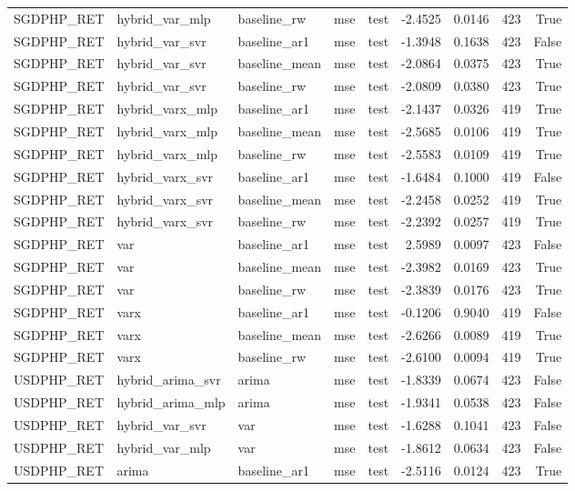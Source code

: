 \begin{tabular}{lllllrrrr}
SGDPHP_RET & hybrid_var_mlp & baseline_rw & mse & test & -2.4525 & 0.0146 & 423 & True \\
SGDPHP_RET & hybrid_var_svr & baseline_ar1 & mse & test & -1.3948 & 0.1638 & 423 & False \\
SGDPHP_RET & hybrid_var_svr & baseline_mean & mse & test & -2.0864 & 0.0375 & 423 & True \\
SGDPHP_RET & hybrid_var_svr & baseline_rw & mse & test & -2.0809 & 0.0380 & 423 & True \\
SGDPHP_RET & hybrid_varx_mlp & baseline_ar1 & mse & test & -2.1437 & 0.0326 & 419 & True \\
SGDPHP_RET & hybrid_varx_mlp & baseline_mean & mse & test & -2.5685 & 0.0106 & 419 & True \\
SGDPHP_RET & hybrid_varx_mlp & baseline_rw & mse & test & -2.5583 & 0.0109 & 419 & True \\
SGDPHP_RET & hybrid_varx_svr & baseline_ar1 & mse & test & -1.6484 & 0.1000 & 419 & False \\
SGDPHP_RET & hybrid_varx_svr & baseline_mean & mse & test & -2.2458 & 0.0252 & 419 & True \\
SGDPHP_RET & hybrid_varx_svr & baseline_rw & mse & test & -2.2392 & 0.0257 & 419 & True \\
SGDPHP_RET & var & baseline_ar1 & mse & test & 2.5989 & 0.0097 & 423 & False \\
SGDPHP_RET & var & baseline_mean & mse & test & -2.3982 & 0.0169 & 423 & True \\
SGDPHP_RET & var & baseline_rw & mse & test & -2.3839 & 0.0176 & 423 & True \\
SGDPHP_RET & varx & baseline_ar1 & mse & test & -0.1206 & 0.9040 & 419 & False \\
SGDPHP_RET & varx & baseline_mean & mse & test & -2.6266 & 0.0089 & 419 & True \\
SGDPHP_RET & varx & baseline_rw & mse & test & -2.6100 & 0.0094 & 419 & True \\
USDPHP_RET & hybrid_arima_svr & arima & mse & test & -1.8339 & 0.0674 & 423 & False \\
USDPHP_RET & hybrid_arima_mlp & arima & mse & test & -1.9341 & 0.0538 & 423 & False \\
USDPHP_RET & hybrid_var_svr & var & mse & test & -1.6288 & 0.1041 & 423 & False \\
USDPHP_RET & hybrid_var_mlp & var & mse & test & -1.8612 & 0.0634 & 423 & False \\
USDPHP_RET & arima & baseline_ar1 & mse & test & -2.5116 & 0.0124 & 423 & True \\

\end{tabular}
